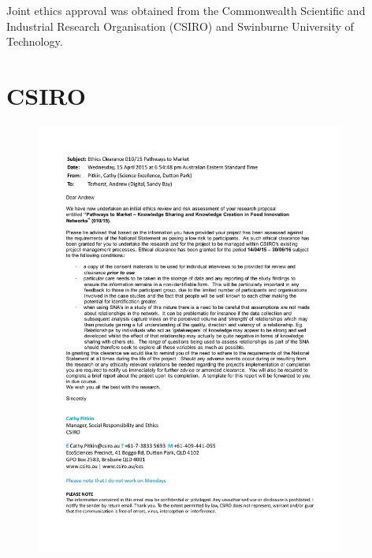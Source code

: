 Joint ethics approval was obtained from the Commonwealth Scientific and Industrial Research Organisation (CSIRO) and Swinburne University of Technology.

\section{CSIRO}

\begin{figure}[hbt!]
    \centering
    \includegraphics[width = 0.9\textwidth]{Images/CSSHREC_010_15.pdf}
    \caption[Evidence of ethics approval -- CSIRO]{}
    \label{fig:csiro_ethics_approval}
\end{figure}

